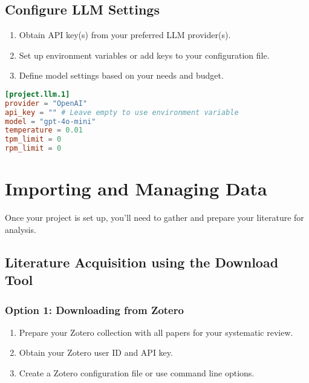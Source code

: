\subsection{Configure LLM Settings}

\begin{enumerate}
    \item Obtain API key(s) from your preferred LLM provider(s).
    \item Set up environment variables or add keys to your configuration file.
    \item Define model settings based on your needs and budget.
\end{enumerate}

\begin{configbox}
\begin{lstlisting}[language=TOML]
[project.llm.1]
provider = "OpenAI"
api_key = "" # Leave empty to use environment variable
model = "gpt-4o-mini"
temperature = 0.01
tpm_limit = 0
rpm_limit = 0
\end{lstlisting}
\end{configbox}


\section{Importing and Managing Data}

Once your project is set up, you'll need to gather and prepare your literature for analysis.

\subsection{Literature Acquisition using the Download Tool}

\subsubsection{Option 1: Downloading from Zotero}

\begin{enumerate}
    \item Prepare your Zotero collection with all papers for your systematic review.
    \item Obtain your Zotero user ID and API key.
    \item Create a Zotero configuration file or use command line options.
\end{enumerate}

